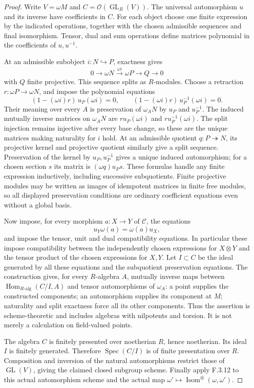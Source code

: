 \begin{proof}
Write $V=\omega M$ and $C=\mathcal O(\operatorname{GL}_R(V))$. The universal automorphism $u$ and its inverse have coefficients in $C$. For each object choose one finite expression by the indicated operations, together with the chosen admissible sequences and final isomorphism. Tensor, dual and sum operations define matrices polynomial in the coefficients of $u,u^{-1}$.

At an admissible subobject $i:N\hookrightarrow P$, exactness gives
\[
 0\longrightarrow\omega N\xrightarrow{\omega i}\omega P\longrightarrow Q\longrightarrow0
\]
with $Q$ finite projective. This sequence splits as $R$-modules. Choose a retraction $r:\omega P\to\omega N$, and impose the polynomial equations
\[
 (1-(\omega i)r)\,u_P(\omega i)=0,
 \qquad
 (1-(\omega i)r)\,u_P^{-1}(\omega i)=0.
\]
Their meaning over every $A$ is preservation of $\omega_A N$ by $u_P$ and $u_P^{-1}$. The induced mutually inverse matrices on $\omega_A N$ are $r u_P(\omega i)$ and $r u_P^{-1}(\omega i)$. The split injection remains injective after every base change, so these are the unique matrices making naturality for $i$ hold. At an admissible quotient $q:P\twoheadrightarrow N$, its projective kernel and projective quotient similarly give a split sequence. Preservation of the kernel by $u_P,u_P^{-1}$ gives a unique induced automorphism; for a chosen section $s$ its matrix is $(\omega q)u_Ps$. These formulas handle any finite expression inductively, including successive subquotients. Finite projective modules may be written as images of idempotent matrices in finite free modules, so all displayed preservation conditions are ordinary coefficient equations even without a global basis.

Now impose, for every morphism $a:X\to Y$ of $\mathcal C$, the equations
\[
 u_Y\omega(a)=\omega(a)u_X,
\]
and impose the tensor, unit and dual compatibility equations. In particular these impose compatibility between the independently chosen expressions for $X\otimes Y$ and the tensor product of the chosen expressions for $X,Y$. Let $I\subset C$ be the ideal generated by all these equations and the subquotient preservation equations. The construction gives, for every $R$-algebra $A$, mutually inverse maps between $\operatorname{Hom}_{R\text{-alg}}(C/I,A)$ and tensor automorphisms of $\omega_A$: a point supplies the constructed components; an automorphism supplies its component at $M$; naturality and split exactness force all its other components. Thus the assertion is scheme-theoretic and includes algebras with nilpotents and torsion. It is not merely a calculation on field-valued points.

The algebra $C$ is finitely presented over noetherian $R$, hence noetherian. Its ideal $I$ is finitely generated. Therefore $\operatorname{Spec}(C/I)$ is of finite presentation over $R$. Composition and inversion of the natural automorphisms restrict those of $\operatorname{GL}(V)$, giving the claimed closed subgroup scheme. Finally apply F.3.12 to this actual automorphism scheme and the actual map $\omega'\mapsto\operatorname{Isom}^{\otimes}(\omega,\omega')$.
\end{proof}

